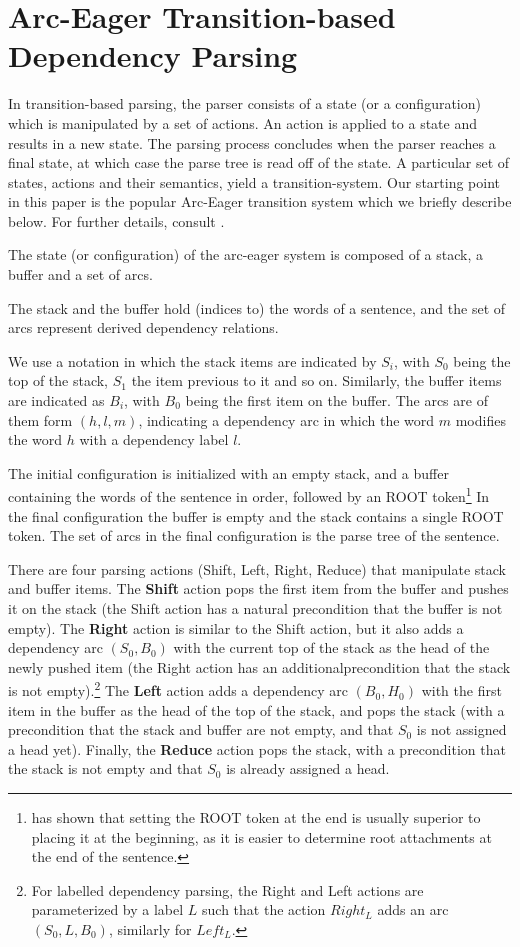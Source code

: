 \documentclass[11pt,letterpaper]{article}
\begin{document}
\section{Arc-Eager Transition-based Dependency Parsing}

In transition-based parsing, the parser consists of a state (or a
configuration) which is manipulated by a set of actions.  An action is
applied to a state and results in a new state.  The parsing process
concludes when the parser reaches a final state, at which case the
parse tree is read off of the state.  A particular set of states,
actions and their semantics, yield a transition-system. Our starting
point in this paper is the popular Arc-Eager transition system which
we briefly describe below.  For further details, consult
\citet{nivre:04,nivre-class}.

The state (or configuration) of the arc-eager system is composed of a
stack, a buffer and a set of arcs.

The stack and the buffer hold (indices to) the words of a sentence,
and the set of arcs represent derived dependency relations.

We use a notation in which the stack items are indicated by $S_i$,
with $S_0$ being the top of the stack, $S_1$ the item previous to it
and so on.  Similarly, the buffer items are indicated as $B_i$, with
$B_0$ being the first item on the buffer.  The arcs are of them form
$(h,l,m)$, indicating a dependency arc in which the word $m$ modifies
the word $h$ with a dependency label $l$.

The initial configuration is initialized with an empty stack, and a
buffer containing the words of the sentence in order, followed by an
ROOT token\footnote{\citet{nivre:squib} has shown that setting the ROOT
token at the end is usually superior to placing it at the beginning, as it is easier
to determine root attachments at the end of the sentence.}
In the final configuration the buffer is empty and the stack contains
a single ROOT token. The set of arcs in the final configuration is the
parse tree of the sentence.


There are four parsing actions (Shift, Left, Right, Reduce) that
manipulate stack and buffer items.  The \textbf{Shift} action pops the
first item from the buffer and pushes it on the stack (the Shift
action has a natural precondition that the buffer is not empty).  The
\textbf{Right} action is similar to the Shift action, but it also adds
a dependency arc $(S_0, B_0)$
with the current top of the stack as the head of the newly pushed item
(the Right action has an additionalprecondition that the stack is not
empty).\footnote{%
For labelled dependency parsing, the Right and Left actions are
parameterized by a label $L$ such that the action $Right_L$ adds an
arc $(S_0, L, B_0)$, similarly for $Left_L$.}
The \textbf{Left} action adds a dependency arc $(B_0, H_0)$ with the
first item in the buffer as the head of the top of the stack, and pops
the stack (with a precondition that the stack and buffer are not
empty, and that $S_0$ is not assigned a head yet). Finally, the
\textbf{Reduce} action pops the stack, with a precondition that the
stack is not empty and that $S_0$ is already assigned a head.
\end{document}
